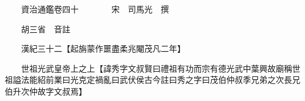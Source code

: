 










 


 
 


 

  
  
  
  
  





  
  
  
  
  
 
  

  

  
  
  



  

 
 

  
   




  

  
  


  　　資治通鑑卷四十　　　　宋　司馬光　撰

　　胡三省　音註

　　漢紀三十二【起旃蒙作噩盡柔兆閹茂凡二年】

　　世祖光武皇帝上之上【諱秀字文叔賢曰禮祖有功而宗有德光武中葉興故廟稱世祖謚法能紹前業曰光克定禍亂曰武伏侯古今註曰秀之字曰茂伯仲叔季兄弟之次長兄伯升次仲故字文叔焉】

